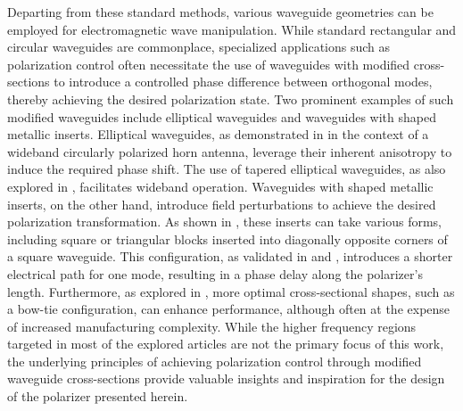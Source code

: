 \documentclass[11pt,a4paper,twoside,openany]{report}
\begin{document}
Departing from these standard methods, various waveguide geometries can be employed for electromagnetic wave manipulation. While standard rectangular and circular waveguides are commonplace, specialized applications such as polarization control often necessitate the use of waveguides with modified cross-sections to introduce a controlled phase difference between orthogonal modes, thereby achieving the desired polarization state. Two prominent examples of such modified waveguides include elliptical waveguides and waveguides with shaped metallic inserts. Elliptical waveguides, as demonstrated in \parencite{yu-et-al:a-wideband-circularly-polarized-horn-antenna-with-a-tapered-elliptical-waveguide-polarizer} in the context of a wideband circularly polarized horn antenna, leverage their inherent anisotropy to induce the required phase shift. The use of tapered elliptical waveguides, as also explored in \parencite{yu-et-al:a-wideband-circularly-polarized-horn-antenna-with-a-tapered-elliptical-waveguide-polarizer}, facilitates wideband operation. Waveguides with shaped metallic inserts, on the other hand, introduce field perturbations to achieve the desired polarization transformation. As shown in \parencite{rud-shpachenko:polarizers-on-sections-of-square-waveguides-with-inner-corner-ridges,bhardwaj-volakis:hexagonal-waveguides-new-class-of-waveguides-for-mmwave-circularly-polarized-horns,bhardwaj-volakis:hexagonal-waveguide-based-circularly-polarized-horn-antennas-for-submmwave-terahertz-band,bhardwaj-volakis:circularly-polarized-horn-antennas-for-terahertz-communications-using-differential-mode-dispersion-in-hexagonal-waveguides}, these inserts can take various forms, including square or triangular blocks inserted into diagonally opposite corners of a square waveguide. This configuration, as validated in \parencite{rud-shpachenko:polarizers-on-sections-of-square-waveguides-with-inner-corner-ridges} and \parencite{bhardwaj-volakis:hexagonal-waveguides-new-class-of-waveguides-for-mmwave-circularly-polarized-horns}, introduces a shorter electrical path for one mode, resulting in a phase delay along the polarizer's length. Furthermore, as explored in \parencite{garcia-marin-masa-campos:bowtie-shaped-radiating-element-for-single-and-dual-circular-polarization}, more optimal cross-sectional shapes, such as a bow-tie configuration, can enhance performance, although often at the expense of increased manufacturing complexity. While the higher frequency regions targeted in most of the explored articles are not the primary focus of this work, the underlying principles of achieving polarization control through modified waveguide cross-sections provide valuable insights and inspiration for the design of the polarizer presented herein.
\end{document}
